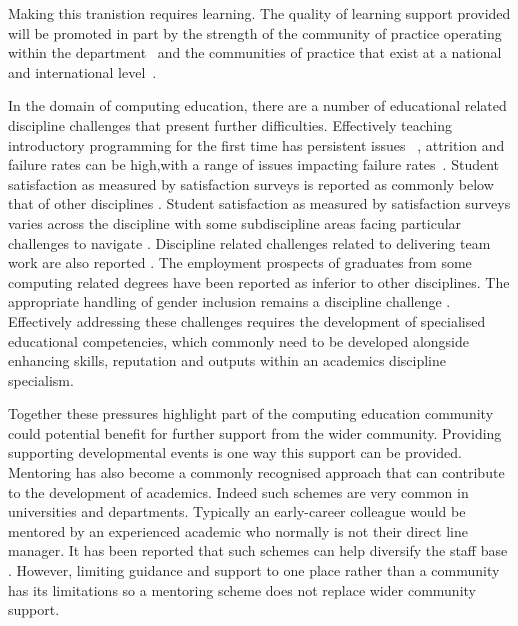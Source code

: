 \documentclass[sigconf]{acmart}
\begin{document}
Making this tranistion requires learning. The quality of learning support provided will be promoted in part by the strength of the community of practice operating within the department~\cite{Bolander2008} and the communities of practice that exist at a national and international level~\cite{Thomas2015}.

\label{sec:Why}

In the domain of computing education, there are a number of educational related discipline challenges that present further difficulties.  Effectively teaching introductory programming for the first time has persistent issues ~\cite{davenport-et-al:latice2016,murphy-et-al:programming2017,simon-et-al:sigcse2018}, attrition and failure rates can be high,with a range of issues impacting failure rates~\cite{Watson:2014:FRI:2591708.2591749}.  Student satisfaction as measured by satisfaction surveys is reported as commonly below that of other disciplines \cite{Sinclair2015}. Student satisfaction as measured by satisfaction surveys varies across the discipline with some subdiscipline areas facing particular challenges to navigate \cite{Knutas2021}. Discipline related challenges related to delivering team work are also reported \cite{Crick2020CEP,Gordon2010}. The employment prospects of graduates from some computing related degrees have been reported as inferior to other disciplines\cite{shadbolt2016shadbolt}. The appropriate handling of gender inclusion remains a discipline challenge \cite{Winter2021}. Effectively addressing these challenges requires the development of specialised educational competencies, which commonly need to be developed alongside enhancing skills, reputation and outputs within an academics discipline specialism. 

Together these pressures highlight part of the computing education community could potential benefit for further support from the wider community. Providing supporting developmental events is one way this support can be provided. Mentoring has also become a commonly recognised approach that can contribute to the development of academics. Indeed such schemes are very common in universities and departments. Typically an early-career colleague would be mentored by an experienced academic who normally is not their direct line manager. It has been reported that such schemes can help diversify the staff base \cite{Golubchik2018}. However, limiting guidance and support to one place rather than a community has its limitations \cite{deJanasz} so a mentoring scheme does not replace wider community support.
\end{document}
